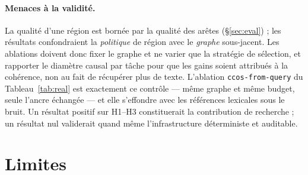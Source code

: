 \documentclass[11pt]{article}
\newcommand{\code}[1]{\texttt{#1}}
\begin{document}
\paragraph{Menaces à la validité.} La qualité d'une région est bornée par la qualité des
arêtes (\S\ref{sec:eval}) ; les résultats confondraient la \emph{politique} de région avec
le \emph{graphe} sous-jacent. Les ablations doivent donc fixer le graphe et ne varier que la
stratégie de sélection, et rapporter le diamètre causal par tâche pour que les gains soient
attribués à la cohérence, non au fait de récupérer plus de texte. L'ablation
\code{ccos-from-query} du Tableau~\ref{tab:real} est exactement ce contrôle --- même graphe
et même budget, seule l'ancre échangée --- et elle s'effondre avec les références lexicales
sous le bruit. Un résultat positif sur H1--H3 constituerait la contribution de recherche ;
un résultat nul validerait quand même l'infrastructure déterministe et auditable.

\section{Limites}
\end{document}
